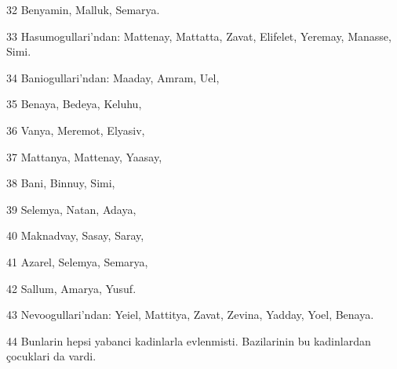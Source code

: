\par 32 Benyamin, Malluk, Semarya.
\par 33 Hasumogullari'ndan: Mattenay, Mattatta, Zavat, Elifelet, Yeremay, Manasse, Simi.
\par 34 Baniogullari'ndan: Maaday, Amram, Uel,
\par 35 Benaya, Bedeya, Keluhu,
\par 36 Vanya, Meremot, Elyasiv,
\par 37 Mattanya, Mattenay, Yaasay,
\par 38 Bani, Binnuy, Simi,
\par 39 Selemya, Natan, Adaya,
\par 40 Maknadvay, Sasay, Saray,
\par 41 Azarel, Selemya, Semarya,
\par 42 Sallum, Amarya, Yusuf.
\par 43 Nevoogullari'ndan: Yeiel, Mattitya, Zavat, Zevina, Yadday, Yoel, Benaya.
\par 44 Bunlarin hepsi yabanci kadinlarla evlenmisti. Bazilarinin bu kadinlardan çocuklari da vardi.


